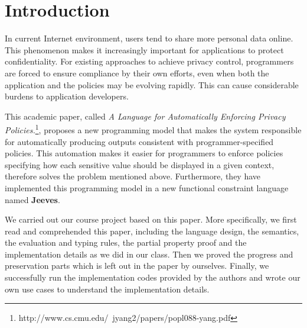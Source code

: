 \section*{Introduction}
\label{intro}

In current Internet environment, users tend to share more personal data online. This phenomenon makes it increasingly important for applications to protect confidentiality. For existing approaches to achieve privacy control, programmers are forced to ensure compliance by their own efforts, even when both the application and the policies may be evolving rapidly. This can cause considerable burdens to application developers.

This academic paper, called \textit{A Language for Automatically Enforcing Privacy Policies.}\footnote{http://www.cs.cmu.edu/~jyang2/papers/popl088-yang.pdf}, proposes a new programming model that makes the system responsible for automatically producing outputs consistent with programmer-specified policies. This automation makes it easier for programmers to enforce policies specifying how each sensitive value should be displayed in a given context, therefore solves the problem mentioned above. Furthermore, they have implemented this programming model in a new functional constraint language named \textbf{Jeeves}.

We carried out our course project based on this paper. More specifically, we first read and comprehended this paper, including the language design, the semantics, the evaluation and typing rules, the partial property proof and the implementation details as we did in our class. Then we proved the progress and preservation parts which is left out in the paper by ourselves. Finally, we successfully run the implementation codes provided by the authors and wrote our own use cases to understand the implementation details.
